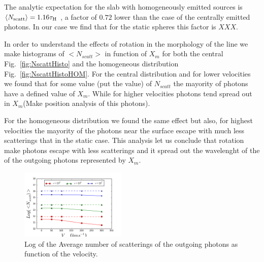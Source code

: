 \documentclass[usenatbib]{mn2e}
\begin{document}
The analytic expectation for the slab with homogeneously emitted
sources is $\langle N_{\rm  scatt}\rangle=1.16\tau_{\rm   H}$
\citep{Harrington73}, a factor of $0.72$ lower than the case of the
centrally emitted photons. In our case we find that for the static
spheres this factor is $XXX$.


In order to understand the effects of rotation in the morphology of the line
 we make histograms of $<N_{scatt}>$  in function of $X_{m}$ for both the 
 central Fig.~\ref{fig:NscattHisto} and the  homogeneous distribution 
 Fig.~\ref{fig:NscattHistoHOM}. For the central distribution and for lower 
 velocities we found that for some value (put the value) of $N_{scatt}$ the 
 mayority of photons have a defined value of $X_{m}$. While for higher 
 velocities photons tend spread out in $X_{m}$(Make position analysis of 
 this photons).

For the homogeneous distribution we found the same effect but also, for 
highest velocities the mayority of the photons near the surface escape 
with much less scatterings that in the static case. This analysis let us 
conclude that rotation make photons escape with less scatterings and it 
spread out the wavelenght of the of the outgoing photons represented by $X_{m}$.


\begin{figure}
    \includegraphics[width=0.45\textwidth]{NscattvsVmax.png}
\caption{Log of the Average number of scatterings of the outgoing
  photons as function of the velocity. \label{fig:Nscatt}}  
\end{figure}
\end{document}
